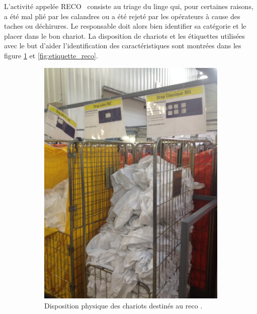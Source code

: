 \documentclass{article}
\newcommand{\rapportFigure}{0.075}
\begin{document}
L'activité appelée \og RECO \fg ~consiste au triage du linge qui, pour
certaines raisons, a été mal plié par les calandres ou a été rejeté par les
opérateurs à cause des taches ou déchirures. Le responsable doit alors bien
identifier sa catégorie et le placer dans le bon chariot. La disposition de
chariots et les étiquettes utilisées avec le but d'aider l'identification des
caractéristiques sont montrées dans les figure \ref{fig:reco} et
\ref{fig:etiquette_reco}.

\FloatBarrier
%
\begin{figure}[h]
    \begin{subfigure}{0.49\textwidth}
        \centering
        \includegraphics[angle=-90, scale= \rapportFigure]{images/reco}
        \caption{Disposition physique des chariots destinés au \og reco \fg.}
        \label{fig:reco}
    \end{subfigure}
    ~
    \begin{subfigure}{0.49\textwidth}
        \centering

\end{subfigure}
\end{figure}
\end{document}
